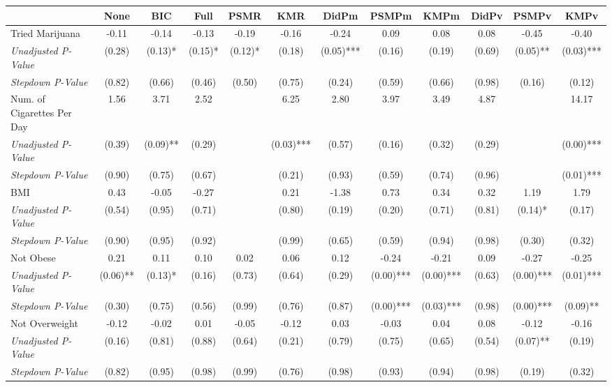 \begin{tabular}{l c c c c c c c c c c c}
\toprule
 & None & BIC & Full & PSMR & KMR & DidPm & PSMPm & KMPm & DidPv & PSMPv & KMPv \\
\midrule
Tried Marijuana & -0.11 & -0.14 & -0.13 & -0.19 & -0.16 & -0.24 & 0.09 & 0.08 & 0.08 & -0.45 & -0.40 \\
\quad \textit{Unadjusted P-Value} & (0.28) & (0.13)* & (0.15)* & (0.12)* & (0.18) & (0.05)*** & (0.16) & (0.19) & (0.69) & (0.05)** & (0.03)*** \\
\quad \textit{Stepdown P-Value} & (0.82) & (0.66) & (0.46) & (0.50) & (0.75) & (0.24) & (0.59) & (0.66) & (0.98) & (0.16) & (0.12) \\
Num. of Cigarettes Per Day & 1.56 & 3.71 & 2.52 & & 6.25 & 2.80 & 3.97 & 3.49 & 4.87 & & 14.17 \\
\quad \textit{Unadjusted P-Value} & (0.39) & (0.09)** & (0.29) & & (0.03)*** & (0.57) & (0.16) & (0.32) & (0.29) & & (0.00)*** \\
\quad \textit{Stepdown P-Value} & (0.90) & (0.75) & (0.67) & & (0.21) & (0.93) & (0.59) & (0.74) & (0.96) & & (0.01)*** \\
BMI & 0.43 & -0.05 & -0.27 & & 0.21 & -1.38 & 0.73 & 0.34 & 0.32 & 1.19 & 1.79 \\
\quad \textit{Unadjusted P-Value} & (0.54) & (0.95) & (0.71) & & (0.80) & (0.19) & (0.20) & (0.71) & (0.81) & (0.14)* & (0.17) \\
\quad \textit{Stepdown P-Value} & (0.90) & (0.95) & (0.92) & & (0.99) & (0.65) & (0.59) & (0.94) & (0.98) & (0.30) & (0.32) \\
Not Obese & 0.21 & 0.11 & 0.10 & 0.02 & 0.06 & 0.12 & -0.24 & -0.21 & 0.09 & -0.27 & -0.25 \\
\quad \textit{Unadjusted P-Value} & (0.06)** & (0.13)* & (0.16) & (0.73) & (0.64) & (0.29) & (0.00)*** & (0.00)*** & (0.63) & (0.00)*** & (0.01)*** \\
\quad \textit{Stepdown P-Value} & (0.30) & (0.75) & (0.56) & (0.99) & (0.76) & (0.87) & (0.00)*** & (0.03)*** & (0.98) & (0.00)*** & (0.09)** \\
Not Overweight & -0.12 & -0.02 & 0.01 & -0.05 & -0.12 & 0.03 & -0.03 & 0.04 & 0.08 & -0.12 & -0.16 \\
\quad \textit{Unadjusted P-Value} & (0.16) & (0.81) & (0.88) & (0.64) & (0.21) & (0.79) & (0.75) & (0.65) & (0.54) & (0.07)** & (0.19) \\
\quad \textit{Stepdown P-Value} & (0.82) & (0.95) & (0.98) & (0.99) & (0.76) & (0.98) & (0.93) & (0.94) & (0.98) & (0.19) & (0.32) \\

\end{tabular}
